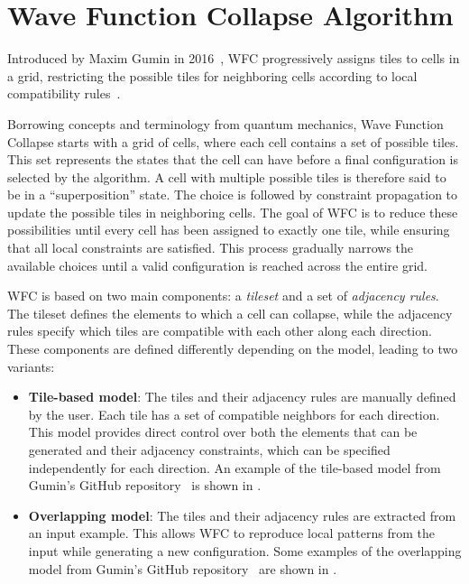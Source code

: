 \documentclass[../../main.tex]{subfiles}
\begin{document}
\section{Wave Function Collapse Algorithm}
\label{sec:soa_wfc}
Introduced by Maxim Gumin in 2016~, WFC progressively assigns tiles to cells in a grid, restricting the possible tiles for neighboring cells according to local compatibility rules~.

Borrowing concepts and terminology from quantum mechanics, Wave Function Collapse starts with a grid of cells, where each cell contains a set of possible tiles. This set represents the states that the cell can have before a final configuration is selected by the algorithm. A cell with multiple possible tiles is therefore said to be in a ``superposition'' state. The choice is followed by constraint propagation to update the possible tiles in neighboring cells. The goal of WFC is to reduce these possibilities until every cell has been assigned to exactly one tile, while ensuring that all local constraints are satisfied. This process gradually narrows the available choices until a valid configuration is reached across the entire grid.

WFC is based on two main components: a \emph{tileset} and a set of \emph{adjacency rules}. The tileset defines the elements to which a cell can collapse, while the adjacency rules specify which tiles are compatible with each other along each direction. These components are defined differently depending on the model, leading to two variants:

\begin{itemize}
    \item \textbf{Tile-based model}: The tiles and their adjacency rules are manually defined by the user. Each tile has a set of compatible neighbors for each direction. This model provides direct control over both the elements that can be generated and their adjacency constraints, which can be specified independently for each direction. An example of the tile-based model from Gumin's GitHub repository~ is shown in .

    \item \textbf{Overlapping model}: The tiles and their adjacency rules are extracted from an input example. This allows WFC to reproduce local patterns from the input while generating a new configuration. Some examples of the overlapping model from Gumin's GitHub repository~ are shown in .

\end{itemize}
\end{document}
